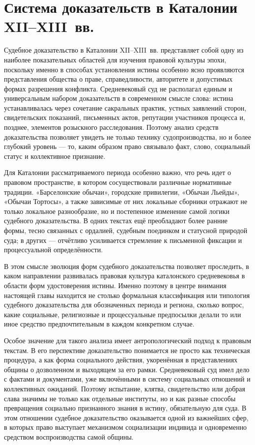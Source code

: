 
\chapter{Система доказательств в Каталонии XII--XIII~вв.}

Судебное доказательство в Каталонии XII--XIII~вв. представляет собой одну из наиболее показательных областей для изучения правовой культуры эпохи, поскольку именно в способах установления истины особенно ясно проявляются представления общества о праве, справедливости, авторитете и допустимых формах разрешения конфликта. Средневековый суд не располагал единым и универсальным набором доказательств в современном смысле слова: истина устанавливалась через сочетание сакральных практик, устных заявлений сторон, свидетельских показаний, письменных актов, репутации участников процесса и, позднее, элементов розыскного расследования. Поэтому анализ средств доказательства позволяет увидеть не только технику судопроизводства, но и более глубокий уровень --- то, каким образом право связывало факт, слово, социальный статус и коллективное признание.

Для Каталонии рассматриваемого периода особенно важно, что речь идет о правовом пространстве, в котором сосуществовали различные нормативные традиции. «Барселонские обычаи», городские привилегии, «Обычаи Льейды», «Обычаи Тортосы», а также зависимые от них локальные сборники отражают не только локальное разнообразие, но и постепенное изменение самой логики судебного доказательства. В одних текстах ещё преобладают более ранние формы, тесно связанных с ордалией, судебным поединком и статусной природой суда; в других --- отчётливо усиливается стремление к письменной фиксации и процессуальной определённости.

В этом смысле эволюция форм судебного доказательства позволяет проследить, в каком направлении развивалась правовая культура каталонского средневековья в области форм удостоверения истины. Именно поэтому в центре внимания настоящей главы находится не столько формальная классификация или типология судебного доказательства для обозначенных периода и региона, сколько вопрос, какие социальные, религиозные и процессуальные предпосылки делали то или иное средство предпочтительным в каждом конкретном случае.

Особое значение для такого анализа имеет антропологический подход к правовым текстам. В его перспективе доказательство понимается не просто как техническая процедура, а как форма социального действия, укоренённая в представлениях общины о дозволенном и выходящем за его рамки. Средневековый суд имел дело с фактами и документами, уже включёнными в систему социальных отношений и коллективных ожиданий. Поэтому испытание, клятва, свидетельство или добрая слава значимы не только как отдельные институты, но и как разные способы превращения социально признанного знания в истину, обязательную для суда. В этом отношении судебное доказательство оказывается одной из важнейших сфер, в которых право выступает механизмом социализации индивида и одновременно средством воспроизводства самой общины.

